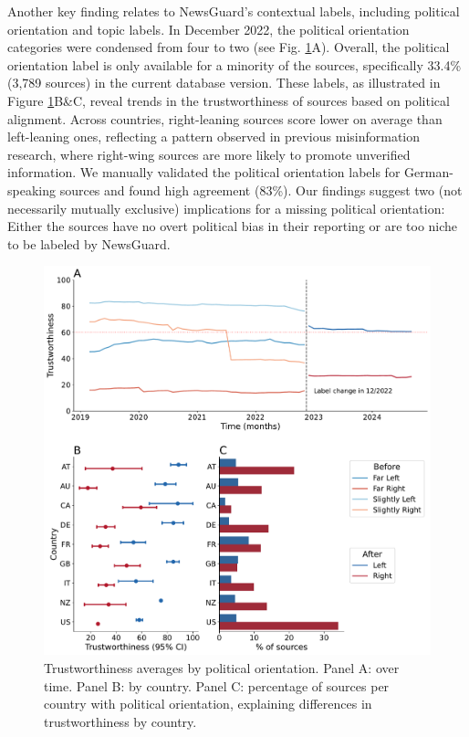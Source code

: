 \documentclass{article}
\begin{document}
Another key finding relates to NewsGuard’s contextual labels, including political orientation and topic labels.
In December 2022, the political orientation categories were condensed from four to two (see Fig. \ref{fig:orientation_panel}A). 
Overall, the political orientation label is only available for a minority of the sources, specifically 33.4\% (3,789 sources) in the current database version.
These labels, as illustrated in Figure \ref{fig:orientation_panel}B\&C, reveal trends in the trustworthiness of sources based on political alignment.
Across countries, right-leaning sources score lower on average than left-leaning ones, reflecting a pattern observed in previous misinformation research, where right-wing sources are more likely to promote unverified information. 
We manually validated the political orientation labels for German-speaking sources and found high agreement (83\%). 
Our findings suggest two (not necessarily mutually exclusive) implications for a missing political orientation: Either the sources have no overt political bias in their reporting or are too niche to be labeled by NewsGuard.

\begin{figure}[H]
    \centering
    \includegraphics[width=\textwidth]{figures/orientation_panel.pdf}
    \caption{Trustworthiness averages by political orientation. Panel A: over time. Panel B: by country. Panel C: percentage of sources per country with political orientation, explaining differences in trustworthiness by country.}
    \label{fig:orientation_panel}
\end{figure}
\end{document}
